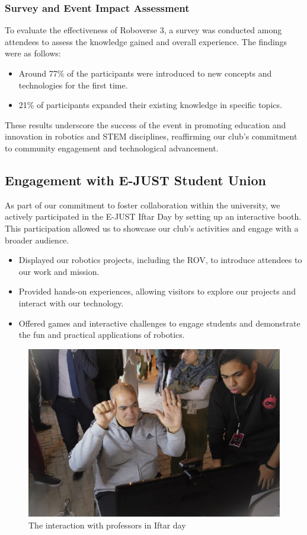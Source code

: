 \documentclass[11pt, twocolumn]{article}
\begin{document}
\subsubsection{Survey and Event Impact Assessment}
To evaluate the effectiveness of Roboverse 3, a survey was conducted among attendees to assess the knowledge gained and overall experience. The findings were as follows:
\begin{itemize}
    \item Around 77\% of the participants were introduced to new concepts and technologies for the first time.
    \item 21\% of participants expanded their existing knowledge in specific topics.
\end{itemize}
These results underscore the success of the event in promoting education and innovation in robotics and STEM disciplines, reaffirming our club’s commitment to community engagement and technological advancement.

\subsection{Engagement with E-JUST Student Union}
As part of our commitment to foster collaboration within the university, we actively participated in the E-JUST Iftar Day by setting up an interactive booth. This participation allowed us to showcase our club's activities and engage with a broader audience.


\begin{itemize}
    \item Displayed our robotics projects, including the ROV, to introduce attendees to our work and mission.
    \item Provided hands-on experiences, allowing visitors to explore our projects and interact with our technology.
    \item Offered games and interactive challenges to engage students and demonstrate the fun and practical applications of robotics.
\end{itemize}
\begin{figure}[h]
            \centering
            \includegraphics[width=0.75\linewidth]{Images/EJUST Iftar.jpg}
            \caption{The interaction with professors in Iftar day}
            \label{fig:enter-label}
                \end{figure}
\end{document}
